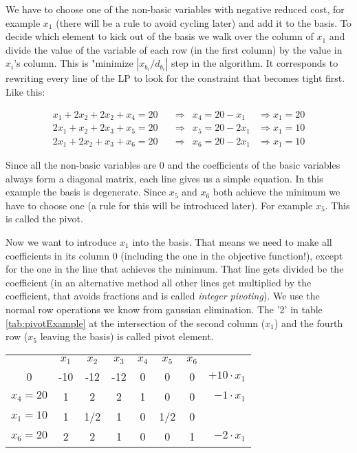 \begin{Ex}
We have to choose one of the non-basic variables with negative reduced cost, for example $x_1$ (there will be a rule to avoid cycling later) and add it to the basis. To decide which element to kick out of the basis we walk over the column of $x_1$ and divide the value of the variable of each row (in the first column) by the value in $x_i$'s column. This is "minimize $|x_{b_i}/d_{b_i}|$ step in the algorithm. It corresponds to rewriting every line of the LP to look for the constraint that becomes tight first. Like this:

\begin{align*}
x_1 + 2 x_2 + 2 x_2 + x_4 = 20 & \quad \Rightarrow & x_4 = 20 - x_1    & \Rightarrow x_1 = 20\\
2 x_1 +x_2 + 2 x_3 + x_5 = 20  & \quad \Rightarrow & x_5 = 20 - 2 x_1  & \Rightarrow x_1 = 10 \\
2 x_1 + 2 x_2 + x_3 + x_6 = 20 & \quad \Rightarrow & x_6 = 20 - 2 x_1  &\Rightarrow x_1 = 10
\end{align*}

Since all the non-basic variables are 0 and the coefficients of the basic variables always form a diagonal matrix, each line gives us a simple equation. In this example the basis is degenerate. Since $x_5$ and $x_6$ both achieve the minimum we have to choose one (a rule for this will be introduced later). For example $x_5$. This is called the pivot.

Now we want to introduce $x_1$ into the basis. That means we need to make all coefficients in its column 0 (including the one in the objective function!), except for the one in the line that achieves the minimum. That line gets divided be the coefficient (in an alternative method all other lines get multiplied by the coefficient, that avoids fractions and is called \emph{integer pivoting}). We use the normal row operations we know from gaussian elimination. The '2' in table \ref{tab:pivotExample} at the intersection of the second column ($x_1$) and the fourth row ($x_5$ leaving the basis) is called pivot element.

\begin{center}
\begin{tabular}{c|ccccccr}
  & $x_1$ & $x_2$ & $x_3$ & $x_4$ & $x_5$ & $x_6$ \\\cline{1-7}
0 & -10 & -12 & -12 & 0 & 0 & 0 &\hspace{1cm} $+10\cdot x_1$\\\hline
$x_4=20$ & 1 & 2   & 2 & 1 &  0   & 0 &\hspace{1cm} $-1\cdot x_1$\\
$x_1=10$ & 1 & 1/2 & 1 & 0 &  1/2 & 0\\
$x_6=20$ & 2 & 2   & 1 & 0 &  0   & 1 &\hspace{1cm} $-2\cdot x_1$\\
\end{tabular}
\end{center}


\end{Ex}
